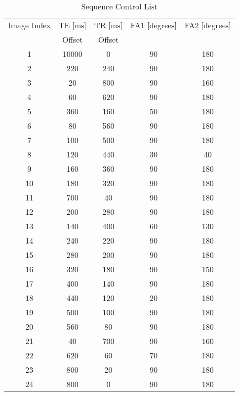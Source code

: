 \documentclass[journal]{IEEEtran}
\begin{document}
\begin{table}[ht]
\caption{Sequence Control List}
\centering
\begin{tabular}{c c c c c}
\hline\hline
Image Index &  TE [ms]& TR [ms] & FA1 [degrees] &  FA2 [degrees]\\
                     &Offset & Offset &                         &  \\%
[0.5ex]
\hline

1   &    10000      &     0     &     90   &      180\\
  2    &    220     &    240    &      90   &      180\\
   3   &     20     &    800  &        90    &     160\\
   4   &     60     &    620  &        90    &     180\\
  5    &    360    &     160 &         50   &      180\\
   6   &     80    &     560  &        90    &     180\\
    7  &    100     &    500 &         90   &      180\\
 8     &    120    &     440 &         30   &       40\\
  9    &    160   &      360 &         90   &      180\\
 10   &      180   &      320 &         90   &      180\\
    11 &     700   &       40  &        90    &     180\\
  12  &      200   &      280 &         90   &      180\\
 13   &      140   &      400 &         60   &      130\\
  14  &      240   &      220 &         90   &      180\\
   15 &      280   &      200 &         90   &      180\\
  16  &      320   &      180 &         90   &      150\\
   17 &      400   &      140 &         90   &      180\\
   18 &      440   &      120 &         20   &      180\\
   19 &      500   &      100 &         90   &      180\\
    20  &    560   &       80  &        90    &     180\\
     21  &    40    &     700  &        90    &     160\\
   22    &   620   &       60  &        70    &     180\\
     23  &   800   &       20  &        90    &     180\\
   24    &   800   &        0   &       90     &    180\\ [1ex]
\hline
\end{tabular}
\label{table:SequenceControlList}
\end{table}
\end{document}
